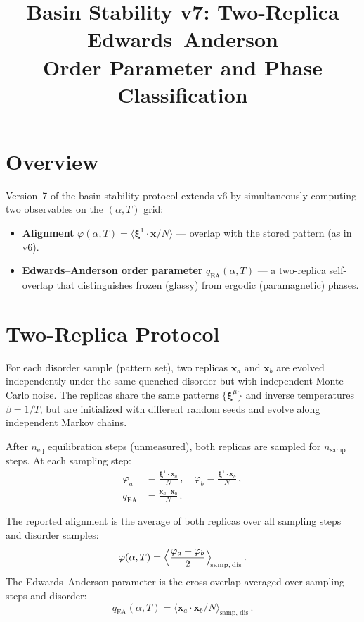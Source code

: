 \documentclass[11pt]{article}
\title{Basin Stability v7: Two-Replica Edwards--Anderson\\
       Order Parameter and Phase Classification}
\author{}
\date{}
\begin{document}
\maketitle

\section{Overview}

Version~7 of the basin stability protocol extends v6 by simultaneously computing two observables on the $(\alpha, T)$ grid:
\begin{itemize}
    \item \textbf{Alignment} $\varphi(\alpha, T) = \langle \boldsymbol{\xi}^1 \!\cdot\! \mathbf{x} / N \rangle$ --- overlap with the stored pattern (as in v6).
    \item \textbf{Edwards--Anderson order parameter} $q_{\mathrm{EA}}(\alpha, T)$ --- a two-replica self-overlap that distinguishes frozen (glassy) from ergodic (paramagnetic) phases.
\end{itemize}

\section{Two-Replica Protocol}
\label{sec:two-replica}

For each disorder sample (pattern set), two replicas $\mathbf{x}_a$ and $\mathbf{x}_b$ are evolved independently under the same quenched disorder but with independent Monte Carlo noise. The replicas share the same patterns $\{\boldsymbol{\xi}^\mu\}$ and inverse temperatures $\beta = 1/T$, but are initialized with different random seeds and evolve along independent Markov chains.

After $n_{\mathrm{eq}}$ equilibration steps (unmeasured), both replicas are sampled for $n_{\mathrm{samp}}$ steps. At each sampling step:
\begin{align}
    \varphi_a &= \frac{\boldsymbol{\xi}^1 \!\cdot\! \mathbf{x}_a}{N}\,,\quad
    \varphi_b = \frac{\boldsymbol{\xi}^1 \!\cdot\! \mathbf{x}_b}{N}\,,\\[6pt]
    q_{\mathrm{EA}} &= \frac{\mathbf{x}_a \!\cdot\! \mathbf{x}_b}{N}\,.
\end{align}

The reported alignment is the average of both replicas over all sampling steps and disorder samples:
\begin{equation}
    \varphi(\alpha, T) = \Bigl\langle \frac{\varphi_a + \varphi_b}{2} \Bigr\rangle_{\!\mathrm{samp,\, dis}}\,.
\end{equation}
The Edwards--Anderson parameter is the cross-overlap averaged over sampling steps and disorder:
\begin{equation}
    q_{\mathrm{EA}}(\alpha, T) = \bigl\langle \mathbf{x}_a \!\cdot\! \mathbf{x}_b / N \bigr\rangle_{\!\mathrm{samp,\, dis}}\,.
\end{equation}
\end{document}
